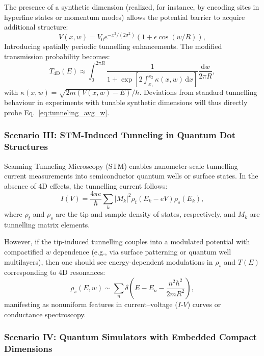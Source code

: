 \documentclass[12pt]{article}
\begin{document}
The presence of a synthetic dimension (realized, for instance, by encoding sites in hyperfine states or momentum modes) allows the potential barrier to acquire additional structure:
\begin{equation}
V(x, w) = V_0 e^{-x^2/(2\sigma^2)} (1 + \epsilon \cos(w/R)),
\label{eq:barrier_synthetic}
\end{equation}
Introducing spatially periodic tunnelling enhancements. The modified transmission probability becomes:
\begin{equation}
T_{\text{4D}}(E) \approx \int_{0}^{2\pi R} \frac{1}{1 + \exp\left[2\int_{x_1}^{x_2} \kappa(x, w) \, \mathrm{d}x \right]} \frac{\mathrm{d}w}{2\pi R},
\label{eq:tunneling_avg_w}
\end{equation}
with \( \kappa(x, w) = \sqrt{2m(V(x, w) - E)}/\hbar \). Deviations from standard tunnelling behaviour in experiments with tunable synthetic dimensions will thus directly probe Eq.~\eqref{eq:tunneling_avg_w}.

\subsubsection*{Scenario III: STM-Induced Tunneling in Quantum Dot Structures}

Scanning Tunneling Microscopy (STM) enables nanometer-scale tunnelling current measurements into semiconductor quantum wells or surface states. In the absence of 4D effects, the tunnelling current follows:
\begin{equation}
I(V) = \frac{4\pi e}{\hbar} \sum_{k} |M_{k}|^2 \rho_t(E_k - eV) \rho_s(E_k),
\label{eq:stm_tunneling}
\end{equation}
where \( \rho_t \) and \( \rho_s \) are the tip and sample density of states, respectively, and \( M_k \) are tunnelling matrix elements.

However, if the tip-induced tunnelling couples into a modulated potential with compactified \( w \) dependence (e.g., via surface patterning or quantum well multilayers), then one should see energy-dependent modulations in \( \rho_s \) and \( T(E) \) corresponding to 4D resonances:
\begin{equation}
\rho_s(E, w) \sim \sum_{n} \delta\left(E - E_n - \frac{n^2 \hbar^2}{2m R^2} \right),
\label{eq:resonances_4d}
\end{equation}
manifesting as nonuniform features in current–voltage (\( I\text{-}V \)) curves or conductance spectroscopy.

\subsubsection*{Scenario IV: Quantum Simulators with Embedded Compact Dimensions}
\end{document}
